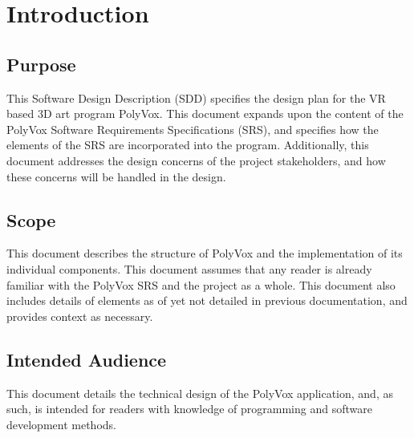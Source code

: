 \documentclass[onecolumn, draftclsnofoot,10pt, compsoc]{IEEEtran}
\begin{document}
\section{Introduction}
\subsection{Purpose}
This Software Design Description (SDD) specifies the design plan for the VR based 3D art program PolyVox. This document expands upon the content of the PolyVox Software Requirements Specifications (SRS), and specifies how the elements of the SRS are incorporated into the program. Additionally, this document addresses the design concerns of the project stakeholders, and how these concerns will be handled in the design. 
\subsection{Scope}
This document describes the structure of PolyVox and the implementation of its individual components. This document assumes that any reader is already familiar with the PolyVox SRS and the project as a whole. This document also includes details of elements as of yet not detailed in previous documentation, and provides context as necessary. 
\subsection{Intended Audience}
This document details the technical design of the PolyVox application, and, as such, is intended for readers with knowledge of programming and software development methods. 
\end{document}
